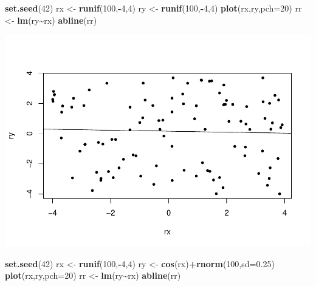 \documentclass[
]{book}
\newenvironment{Shaded}{\begin{snugshade}}{\end{snugshade}}
\newcommand{\AttributeTok}[1]{\textcolor[rgb]{0.13,0.29,0.53}{#1}}
\newcommand{\DecValTok}[1]{\textcolor[rgb]{0.00,0.00,0.81}{#1}}
\newcommand{\FloatTok}[1]{\textcolor[rgb]{0.00,0.00,0.81}{#1}}
\newcommand{\FunctionTok}[1]{\textcolor[rgb]{0.13,0.29,0.53}{\textbf{#1}}}
\newcommand{\NormalTok}[1]{#1}
\newcommand{\OtherTok}[1]{\textcolor[rgb]{0.56,0.35,0.01}{#1}}
\newcommand{\SpecialCharTok}[1]{\textcolor[rgb]{0.81,0.36,0.00}{\textbf{#1}}}
\begin{document}
\begin{Shaded}
\begin{Highlighting}[]
\FunctionTok{set.seed}\NormalTok{(}\DecValTok{42}\NormalTok{)}
\NormalTok{rx }\OtherTok{\textless{}{-}} \FunctionTok{runif}\NormalTok{(}\DecValTok{100}\NormalTok{,}\SpecialCharTok{{-}}\DecValTok{4}\NormalTok{,}\DecValTok{4}\NormalTok{)}
\NormalTok{ry }\OtherTok{\textless{}{-}} \FunctionTok{runif}\NormalTok{(}\DecValTok{100}\NormalTok{,}\SpecialCharTok{{-}}\DecValTok{4}\NormalTok{,}\DecValTok{4}\NormalTok{)}
\FunctionTok{plot}\NormalTok{(rx,ry,}\AttributeTok{pch=}\DecValTok{20}\NormalTok{)}
\NormalTok{rr }\OtherTok{\textless{}{-}} \FunctionTok{lm}\NormalTok{(ry}\SpecialCharTok{\textasciitilde{}}\NormalTok{rx)}
\FunctionTok{abline}\NormalTok{(rr)}
\end{Highlighting}
\end{Shaded}

\includegraphics{_main_files/figure-latex/unnamed-chunk-19-1.pdf}

\begin{Shaded}
\begin{Highlighting}[]
\FunctionTok{set.seed}\NormalTok{(}\DecValTok{42}\NormalTok{)}
\NormalTok{rx }\OtherTok{\textless{}{-}} \FunctionTok{runif}\NormalTok{(}\DecValTok{100}\NormalTok{,}\SpecialCharTok{{-}}\DecValTok{4}\NormalTok{,}\DecValTok{4}\NormalTok{)}
\NormalTok{ry }\OtherTok{\textless{}{-}} \FunctionTok{cos}\NormalTok{(rx)}\SpecialCharTok{+}\FunctionTok{rnorm}\NormalTok{(}\DecValTok{100}\NormalTok{,}\AttributeTok{sd=}\FloatTok{0.25}\NormalTok{)}
\FunctionTok{plot}\NormalTok{(rx,ry,}\AttributeTok{pch=}\DecValTok{20}\NormalTok{)}
\NormalTok{rr }\OtherTok{\textless{}{-}} \FunctionTok{lm}\NormalTok{(ry}\SpecialCharTok{\textasciitilde{}}\NormalTok{rx)}
\FunctionTok{abline}\NormalTok{(rr)}
\end{Highlighting}
\end{Shaded}
\end{document}
